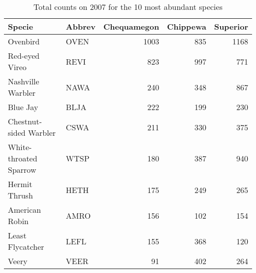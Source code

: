 \begin{table}[ht]
\centering
\caption{Total counts on 2007 for the 10 most abundant species} 
\label{count07}
\begin{tabular}{llrrr}
  \hline
Specie & Abbrev & Chequamegon & Chippewa & Superior \\ 
  \hline
Ovenbird & OVEN & 1003 & 835 & 1168 \\ 
  Red-eyed Vireo & REVI & 823 & 997 & 771 \\ 
  Nashville Warbler & NAWA & 240 & 348 & 867 \\ 
  Blue Jay & BLJA & 222 & 199 & 230 \\ 
  Chestnut-sided Warbler & CSWA & 211 & 330 & 375 \\ 
  White-throated Sparrow & WTSP & 180 & 387 & 940 \\ 
  Hermit Thrush & HETH & 175 & 249 & 265 \\ 
  American Robin & AMRO & 156 & 102 & 154 \\ 
  Least Flycatcher & LEFL & 155 & 368 & 120 \\ 
  Veery & VEER &  91 & 402 & 264 \\ 
   \hline
\end{tabular}
\end{table}
